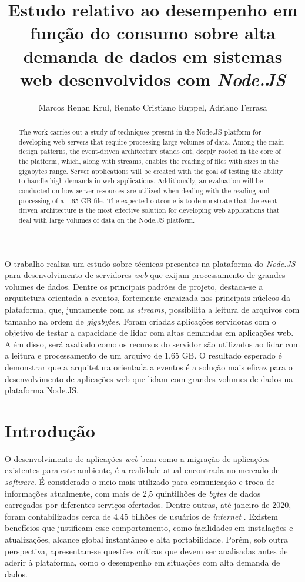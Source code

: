 \documentclass[12pt]{article}
\title{Estudo relativo ao desempenho em função do consumo sobre alta demanda de dados em sistemas web desenvolvidos com \textit{Node.JS}}
\author{Marcos Renan Krul\inst{1}, Renato Cristiano Ruppel\inst{1}, Adriano Ferrasa\inst{1}}
\begin{document}
 

\maketitle


\begin{resumo} 
O trabalho realiza um estudo sobre técnicas presentes na plataforma do \textit{Node.JS} para desenvolvimento de servidores \textit{web} 
que exijam processamento de grandes volumes de dados. Dentre os principais padrões de projeto, destaca-se a arquitetura orientada a eventos,
fortemente enraizada nos principais núcleos da plataforma, que, juntamente com as \textit{streams}, possibilita a leitura de arquivos 
com tamanho na ordem de \textit{gigabytes}. Foram criadas aplicações servidoras com o objetivo de testar a capacidade de lidar com altas 
demandas em aplicações web. Além disso, será avaliado como os recursos do servidor são utilizados ao lidar com a leitura e processamento 
de um arquivo de 1,65 GB. O resultado esperado é demonstrar que a arquitetura orientada a eventos é a solução mais eficaz para o 
desenvolvimento de aplicações web que lidam com grandes volumes de dados na plataforma Node.JS.
\end{resumo}


\begin{abstract} 
The work carries out a study of techniques present in the Node.JS platform for developing web servers that require processing large
volumes of data. Among the main design patterns, the event-driven architecture stands out, deeply rooted in the core of the platform, 
which, along with streams, enables the reading of files with sizes in the gigabytes range. Server applications will be created with the 
goal of testing the ability to handle high demands in web applications. Additionally, an evaluation will be conducted on how server 
resources are utilized when dealing with the reading and processing of a 1.65 GB file. The expected outcome is to demonstrate that the 
event-driven architecture is the most effective solution for developing web applications that deal with large volumes of data on the Node.JS platform.
\end{abstract}


\section{Introdução}

O desenvolvimento de aplicações \textit{web} bem como a migração de aplicações existentes para este ambiente,
é a realidade atual encontrada no mercado de \textit{software}. É considerado o meio mais utilizado
para comunicação e troca de informações atualmente, com mais de 2,5 quintilhões de \textit{bytes} de dados
carregados por diferentes serviços ofertados. Dentre outras, até janeiro de 2020, foram 
contabilizados cerca de 4,45 bilhões de usuários de \textit{internet} \cite{WEBUSAGE}. 
Existem benefícios que justificam esse comportamento, como facilidades em instalações e atualizações, 
alcance global instantâneo e alta portabilidade. Porém, sob outra perspectiva, apresentam-se questões 
críticas que devem ser analisadas antes de aderir à plataforma, como o desempenho em situações com 
alta demanda de dados.
\end{document}
